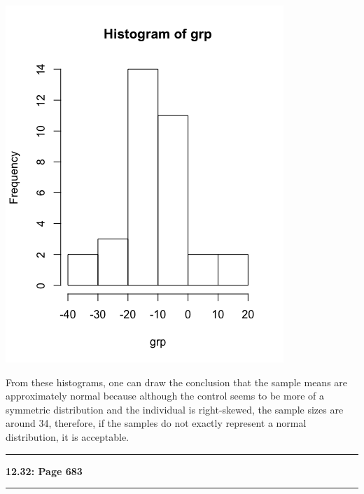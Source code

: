 \documentclass[11pt]{article}
\newcommand\question[2]{\vspace{.25in}\hrule\textbf{#1: #2}\vspace{.5em}\hrule\vspace{.10in}}
\begin{document}
		\includegraphics[scale=0.38]{images/grpHist.png}\par
		
		From these histograms, one can draw the conclusion that the sample means are approximately normal because although the control seems to be more of a symmetric distribution and the individual is right-skewed, the sample sizes are around 34, therefore, if the samples do not exactly represent a normal distribution, it is acceptable.\par
	

\question{12.32}{Page 683}
\end{document}
